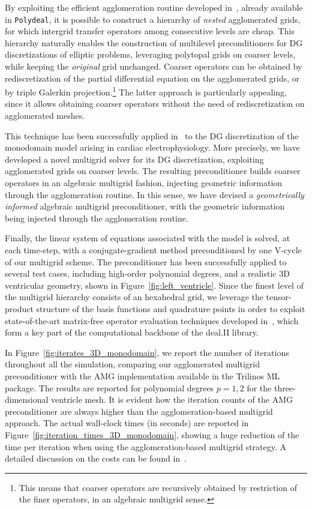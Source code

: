 \documentclass[a4paper,12pt]{article}
\begin{document}
By exploiting the efficient agglomeration routine developed in~\cite{FEDER2025113773}, already available in \texttt{Polydeal}, it is possible to construct
a hierarchy of \emph{nested} agglomerated grids, for which intergrid transfer operators among consecutive levels are cheap. This hierarchy naturally enables the construction of multilevel preconditioners for DG discretizations of elliptic problems, leveraging polytopal grids on coarser levels, while keeping the \emph{original} grid unchanged. Coarser operators can be obtained by rediscretization of the partial differential
equation on the agglomerated grids, or by triple Galerkin projection.\footnote{This means that coarser operators are recursively obtained by restriction of the finer operators, in an algebraic multigrid sense.} The latter approach is particularly appealing, since it
allows obtaining coarser operators without the need of rediscretization on agglomerated meshes.

This technique has been successfully applied in~\cite{feder2026agglomeration} to the DG discretization of the monodomain model arising in cardiac electrophysiology. More precisely, we have developed a novel multigrid solver for its DG discretization, exploiting agglomerated
grids on coarser levels. The resulting preconditioner builds coarser operators in an algebraic multigrid fashion, injecting geometric information through the agglomeration routine. In this sense, we
have devised a \emph{geometrically informed} algebraic multigrid preconditioner, with the geometric information being injected through the agglomeration routine.

Finally, the linear system of equations associated with the model is solved, at each time-step, with a conjugate-gradient method preconditioned by one V-cycle of our multigrid scheme. The preconditioner has been successfully applied to several test cases, including high-order polynomial degrees, and a realistic 3D ventricular geometry, shown in Figure~\ref{fig:left_ventricle}. Since the
finest level of the multigrid hierarchy consists of an hexahedral grid, we leverage the tensor-product structure of the basis functions and quadrature points in order to exploit state-of-the-art matrix-free operator evaluation techniques developed in~\cite{KronbichlerKormann}, which form a key part of the computational backbone of
the deal.II library.

In Figure~\ref{fig:iterates_3D_monodomain}, we report the number of iterations throughout all the simulation, comparing our agglomerated multigrid preconditioner with the AMG implementation available in the Trilinos ML package. The results are reported
for polynomial degrees $p\!=\!1,2$ for the three-dimensional ventricle mesh. It is evident how
the iteration counts of the AMG preconditioner are always higher than the agglomeration-based multigrid approach. The actual wall-clock
times (in seconds) are reported in Figure~\ref{fig:iteration_times_3D_monodomain}, showing a huge reduction of the time per iteration when using
the agglomeration-based multigrid strategy. A detailed discussion on the costs can be found in~\cite{feder2026agglomeration}.
\end{document}
